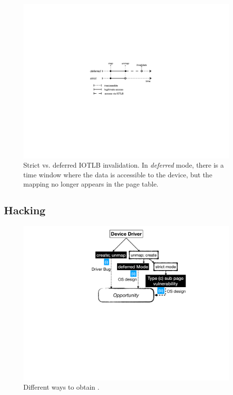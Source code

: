 \begin{figure}[t]
    \centering
    \includegraphics[width=0.9\columnwidth]{figs/strict.pdf}
    \caption{Strict vs. deferred IOTLB invalidation. In \emph{deferred} mode, there is a time window where the data is accessible to the device, but the mapping no longer appears in the page table.}
    \label{fig:deferred}
\end{figure}

\subsection{Hacking~\oportunity{}}\label{sec:shinfo}

\begin{figure}[t]
    \centering
    \includegraphics[width=0.8\linewidth]{figs/road_to_op.pdf}
    \caption{Different ways to obtain \oportunity.}
    \label{fig:road_to_op}
\end{figure}

